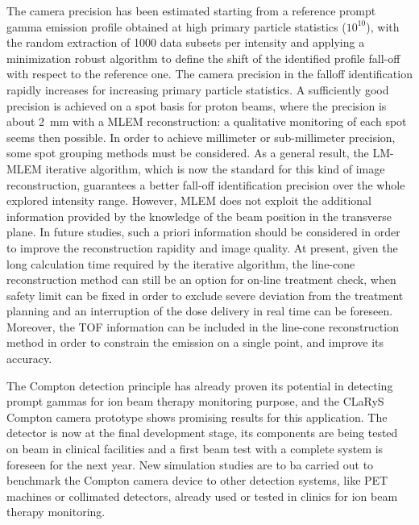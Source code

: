The camera precision has been estimated starting from a reference prompt gamma emission profile obtained at high primary particle statistics ($10^{10}$), with the random extraction of 1000 data subsets per intensity and applying a minimization robust algorithm to define the shift of the identified profile fall-off with respect to the reference one.
The camera precision in the falloff identification rapidly increases for increasing primary particle statistics. A sufficiently good precision is achieved on a spot basis for proton beams, where the precision is about 2~mm with a MLEM reconstruction: a qualitative monitoring of each spot seems then possible. In order to achieve millimeter or sub-millimeter precision, some spot grouping methods must be considered. As a general result, the LM-MLEM iterative algorithm, which is now the standard for this kind of image reconstruction,  guarantees a better fall-off identification precision over the whole explored intensity range. However, MLEM does not exploit the additional information provided by the knowledge of the beam position in the transverse plane. In future studies, such a priori information should be considered in order to improve the reconstruction rapidity and image quality. At present, given the long calculation time required by the iterative algorithm, the line-cone reconstruction method can still be an option for on-line treatment check, when safety limit can be fixed in order to exclude severe deviation from the treatment planning and an interruption of the dose delivery in real time can be foreseen. Moreover, the TOF information can be included in the line-cone reconstruction method in order to constrain the emission on a single point, and improve its accuracy.

The Compton detection principle has already proven its potential in detecting prompt gammas for ion beam therapy monitoring purpose, and the CLaRyS Compton camera prototype shows promising results for this application. The detector is now at the final development stage, its components are being tested on beam in clinical facilities and a first beam test with a complete system is foreseen for the next year. New simulation studies are to ba carried out to benchmark the Compton camera device to other detection systems, like PET machines or collimated detectors, already used or tested in clinics for ion beam therapy monitoring.            


